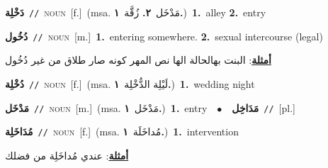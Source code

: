 \documentclass[10pt,a4paper,twoside]{article} %
\begin{document}
\begin{multicols}{2}
{\setlength\topsep{0pt}\textbf{\foreignlanguage{arabic}{دَخْلِة}}\ {\color{gray}\texttt{//}\color{black}}\ \textsc{noun}\ [f.]\ \color{gray}(msa. \foreignlanguage{arabic}{مَدْخَل}~\foreignlanguage{arabic}{\textbf{٢.}}  \foreignlanguage{arabic}{زُقَّة}~\foreignlanguage{arabic}{\textbf{١.}})\color{black}\ \textbf{1.}~alley  \textbf{2.}~entry\ } \vspace{2mm}

{\setlength\topsep{0pt}\textbf{\foreignlanguage{arabic}{دُخُول}}\ {\color{gray}\texttt{//}\color{black}}\ \textsc{noun}\ [m.]\ \textbf{1.}~entering somewhere.  \textbf{2.}~sexual intercourse (legal)\  \begin{flushright}\color{gray}\foreignlanguage{arabic}{\textbf{\underline{\foreignlanguage{arabic}{أمثلة}}}: البنت بهالحالة الها نص المهر كونه صار طلاق من غير دُخُول}\end{flushright}\color{black}} \vspace{2mm}

{\setlength\topsep{0pt}\textbf{\foreignlanguage{arabic}{دُخْلِة}}\ {\color{gray}\texttt{//}\color{black}}\ \textsc{noun}\ [f.]\ \color{gray}(msa. \foreignlanguage{arabic}{لَيْلِة الدُّخْلِة}~\foreignlanguage{arabic}{\textbf{١.}})\color{black}\ \textbf{1.}~wedding night\ } \vspace{2mm}

{\setlength\topsep{0pt}\textbf{\foreignlanguage{arabic}{مَدْخَل}}\ {\color{gray}\texttt{//}\color{black}}\ \textsc{noun}\ [m.]\ \color{gray}(msa. \foreignlanguage{arabic}{مَدْخَل}~\foreignlanguage{arabic}{\textbf{١.}})\color{black}\ \textbf{1.}~entry\ \ $\bullet$\ \ \setlength\topsep{0pt}\textbf{\foreignlanguage{arabic}{مَدَاخِل}}\ {\color{gray}\texttt{//}\color{black}}\ [pl.]\ } \vspace{2mm}

{\setlength\topsep{0pt}\textbf{\foreignlanguage{arabic}{مُدَاخَلِة}}\ {\color{gray}\texttt{//}\color{black}}\ \textsc{noun}\ [f.]\ \color{gray}(msa. \foreignlanguage{arabic}{مُداخَلَة}~\foreignlanguage{arabic}{\textbf{١.}})\color{black}\ \textbf{1.}~intervention\  \begin{flushright}\color{gray}\foreignlanguage{arabic}{\textbf{\underline{\foreignlanguage{arabic}{أمثلة}}}: عندي مُداخَلِة من فضلك}\end{flushright}\color{black}} \vspace{2mm}


\end{multicols}
\end{document}
